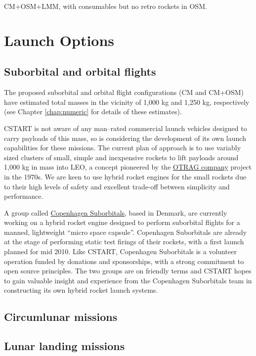 \documentclass{report}
\begin{document}
CM+OSM+LMM, with consumables but no retro rockets in OSM.

\section{Launch Options}

\subsection{Suborbital and orbital flights}

The proposed suborbital and orbital flight configurations (CM and CM+OSM) have estimated total masses in the vicinity of 1,000 kg and 1,250 kg, respectively (see Chapter \ref{chap:numeric} for details of these estimates).

CSTART is not aware of any man--rated commercial launch vehicles designed to carry payloads of this mass, so is considering the development of its own launch capabilities for these missions.  The current plan of approach is to use variably sized clusters of small, simple and inexpensive rockets to lift payloads around 1,000 kg in mass into LEO, a concept pioneered by the \href{http://en.wikipedia.org/wiki/OTRAG}{OTRAG company} project in the 1970s.  We are keen to use hybrid rocket engines for the small rockets due to their high levels of safety and excellent trade-off between simplicity and performance.

A group called \href{http://www.copenhagensuborbitals.com/}{Copenhagen Suborbitals}, based in Denmark, are currently working on a hybrid rocket engine designed to perform suborbital flights for a manned, lightweight ``micro space capsule''.  Copenhagen Suborbitals are already at the stage of performing static test firings of their rockets, with a first launch planned for mid 2010.  Like CSTART, Copenhagen Suborbitals is a volunteer operation funded by donations and sponsorships, with a strong commitment to open source principles.  The two groups are on friendly terms and CSTART hopes to gain valuable insight and experience from the Copenhagen Suborbitals team in constructing its own hybrid rocket launch systems.

\subsection{Circumlunar missions}

\subsection{Lunar landing missions}
\end{document}
